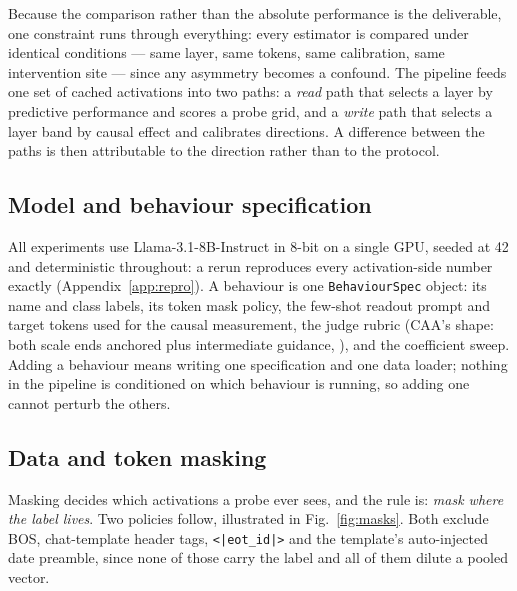 \documentclass[conference]{IEEEtran}
\begin{document}
Because the comparison rather than the absolute performance is the deliverable,
one constraint runs through everything: every estimator is compared under
identical conditions --- same layer, same tokens, same calibration, same
intervention site --- since any asymmetry becomes a confound. The pipeline feeds
one set of cached activations into two paths: a \emph{read} path that selects a
layer by predictive performance and scores a probe grid, and a \emph{write} path
that selects a layer band by causal effect and calibrates directions. A
difference between the paths is then attributable to the direction rather than
to the protocol.

\subsection{Model and behaviour specification}
All experiments use Llama-3.1-8B-Instruct in 8-bit on a single GPU, seeded at
42 and deterministic throughout: a rerun reproduces every activation-side
number exactly (Appendix~\ref{app:repro}). A behaviour
is one \texttt{BehaviourSpec} object: its name and class labels, its token mask
policy, the few-shot readout prompt and target tokens used for the causal
measurement, the judge rubric (CAA's shape: both scale ends anchored plus
intermediate guidance, \citealt{rimsky2024}), and the coefficient sweep. Adding
a behaviour means writing one specification and one data loader; nothing in the
pipeline is conditioned on which behaviour is running, so adding one cannot
perturb the others.

\subsection{Data and token masking}
\label{sec:masking}

Masking decides which activations a probe ever sees, and the rule is: \emph{mask
where the label lives}. Two policies follow, illustrated in
Fig.~\ref{fig:masks}. Both exclude BOS, chat-template header tags,
\texttt{<|eot\_id|>} and the template's auto-injected date preamble, since none
of those carry the label and all of them dilute a pooled vector.
\end{document}
